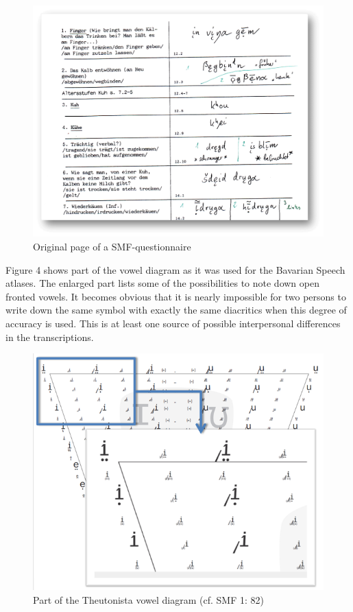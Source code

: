 \documentclass[output=paper]{LSP/langsci}
\begin{document}
\begin{figure}
\includegraphics[width=\textwidth]{illustrations/mathus_fig3}
\caption{Original page of a SMF-questionnaire}
\label{fig:3}
\end{figure}

Figure 4 shows part of the vowel diagram as it was used for the Bavarian Speech atlases. The enlarged part lists some of the possibilities to note down open fronted vowels. It becomes obvious that it is nearly impossible for two persons to write down the same symbol with exactly the same diacritics when this degree of accuracy is used. This is at least one source of possible interpersonal differences in the transcriptions.

\begin{figure}
\includegraphics[width=\textwidth]{illustrations/mathus_fig4}
\caption{Part of the Theutonista vowel diagram (cf. SMF 1: 82)}
\label{fig:4}
\end{figure}
\end{document}
